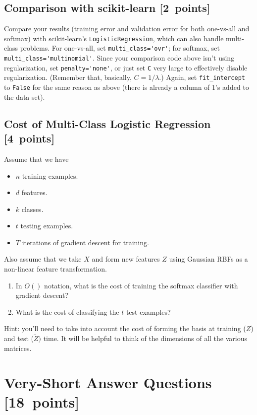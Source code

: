 \documentclass{article}
\newcommand{\blu}[1]{{\textcolor{blu}{#1}}}
\let\ask\blu
\newcommand\pts[1]{\textcolor{pointscolour}{[#1~points]}}
\begin{document}
\subsection{Comparison with scikit-learn \pts{2}}
\ask{Compare your results (training error and validation error for both one-vs-all and softmax) with scikit-learn's \texttt{LogisticRegression}},
which can also handle multi-class problems.
For one-vs-all, set \verb|multi_class='ovr'|; for softmax, set \verb|multi_class='multinomial'|.
Since your comparison code above isn't using regularization, set \verb|penalty='none'|, or just set \verb|C| very large to effectively disable regularization.
(Remember that, basically, $C = 1 / \lambda$.)
Again, set \verb|fit_intercept| to \verb|False| for the same reason as above (there is already a column of $1$'s added to the data set).


\subsection{Cost of Multi-Class Logistic Regression \pts{4}}

Assume that we have
\begin{itemize}
    \item $n$ training examples.
    \item $d$ features.
    \item $k$ classes.
    \item $t$ testing examples.
    \item $T$ iterations of gradient descent for training.
\end{itemize}
Also assume that we take $X$ and form new features $Z$ using Gaussian RBFs as a non-linear feature transformation.
\begin{enumerate}
\item \ask{In $O()$ notation, what is the cost of training the softmax classifier with gradient descent?}
\item \ask{What is the cost of classifying the $t$ test examples?}
\end{enumerate}
Hint: you'll need to take into account the cost of forming the basis at training ($Z$) and test ($\tilde{Z})$ time. It will be helpful to think of the dimensions of all the various matrices.








\clearpage
\section{Very-Short Answer Questions \pts{18}}
\end{document}
